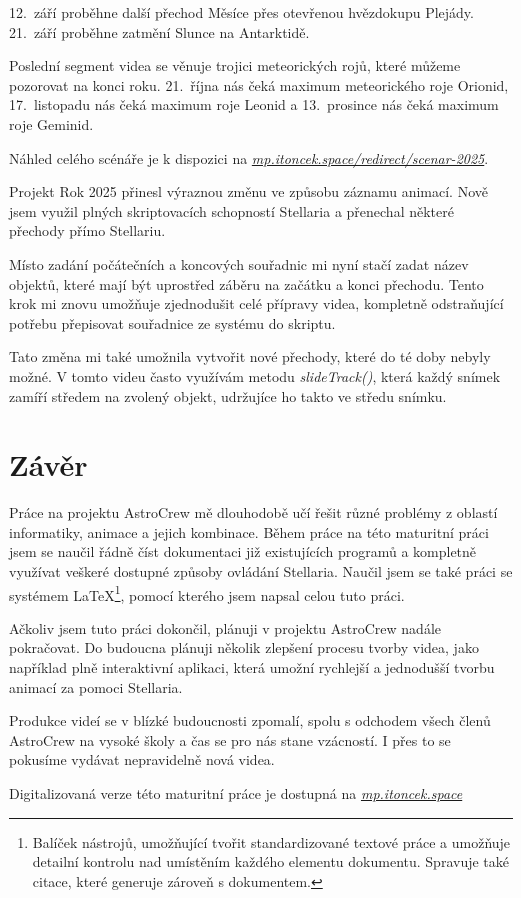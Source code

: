 \documentclass[12pt,a4paper,titlepage]{article}
\newcommand{\link}[2]{\href{#1}{\textit{#2}}}%
\begin{document}
12.\ září proběhne další přechod Měsíce přes otevřenou hvězdokupu Plejády. 21.\ září proběhne zatmění Slunce na Antarktidě.

Poslední segment videa se věnuje trojici meteorických rojů, které můžeme pozorovat na konci roku. 21.\ října nás čeká maximum meteorického roje Orionid, 17.\ listopadu nás čeká maximum roje Leonid a 13.\ prosince nás čeká maximum roje Geminid.

Náhled celého scénáře je k dispozici na \link{https://mp.itoncek.space/redirect/scenar-2025}{mp.itoncek.space/redirect/scenar-2025}.


Projekt Rok 2025 přinesl výraznou změnu ve způsobu záznamu animací. Nově jsem využil plných skriptovacích schopností Stellaria a přenechal některé přechody přímo Stellariu. 

Místo zadání počátečních a koncových souřadnic mi nyní stačí zadat název objektů, které mají být uprostřed záběru na začátku a konci přechodu. Tento krok mi znovu umožňuje zjednodušit celé přípravy videa, kompletně odstraňující potřebu přepisovat souřadnice ze systému do skriptu. 

Tato změna mi také umožnila vytvořit nové přechody, které do té doby nebyly možné. V tomto videu často využívám metodu \textit{slideTrack()}, která každý snímek zamíří středem na zvolený objekt, udržujíce ho takto ve středu snímku. %

\section{Závěr}
Práce na projektu AstroCrew mě dlouhodobě učí řešit různé problémy z oblastí informatiky, animace a jejich kombinace. Během práce na této maturitní práci jsem se naučil řádně číst dokumentaci již existujících programů a kompletně využívat veškeré dostupné způsoby ovládání Stellaria. Naučil jsem se také práci se systémem \LaTeX{}\footnote{Balíček nástrojů, umožňující tvořit standardizované textové práce a umožňuje detailní kontrolu nad umístěním každého elementu dokumentu. Spravuje také citace, které generuje zároveň s dokumentem.}, pomocí kterého jsem napsal celou tuto práci.

Ačkoliv jsem tuto práci dokončil, plánuji v projektu AstroCrew nadále pokračovat. Do budoucna plánuji několik zlepšení procesu tvorby videa, jako například plně interaktivní aplikaci, která umožní rychlejší a jednodušší tvorbu animací za pomoci Stellaria. 

Produkce videí se v blízké budoucnosti zpomalí, spolu s odchodem všech členů AstroCrew na vysoké školy a čas se pro nás stane vzácností. I přes to se pokusíme vydávat nepravidelně nová videa.

Digitalizovaná verze této maturitní práce je dostupná na \link{https://mp.itoncek.space}{mp.itoncek.space}
\end{document}
